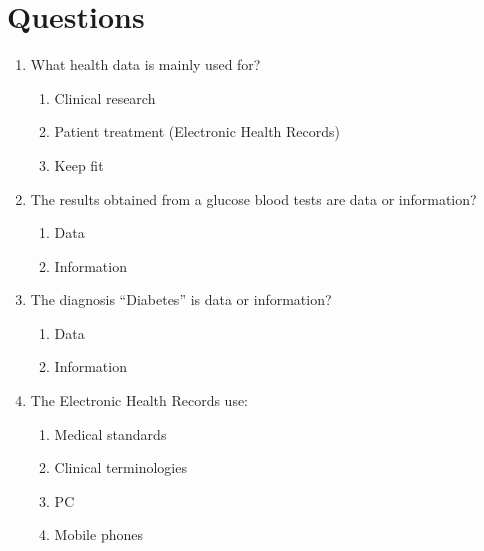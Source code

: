 \documentclass[10pt, twoside]{article}   	%
\begin{document}
\section{Questions}
\renewcommand{\labelenumii}{\alph{enumii}}
      \begin{enumerate}
       \item What health data is mainly used for?
          \begin{enumerate}  
              \item Clinical research
              \item Patient treatment (Electronic Health Records)
              \item Keep fit
           \end {enumerate}       
       \item The results obtained from a glucose blood tests are data or information?
          \begin{enumerate}  
              \item Data
              \item Information
           \end {enumerate}       
       \item The diagnosis “Diabetes” is data or information?
          \begin{enumerate}  
              \item Data
              \item Information
           \end {enumerate}       
       \item The Electronic Health Records use:
          \begin{enumerate}  
              \item Medical standards
              \item Clinical terminologies
              \item PC
              \item Mobile phones
           \end {enumerate}       

\end{enumerate}
\end{document}
